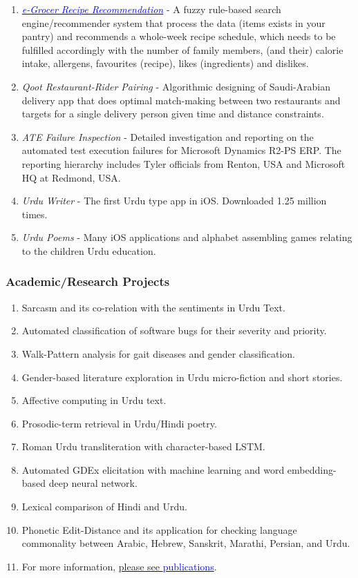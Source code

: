 \documentclass[a4paper, 10pt]{article}
\begin{document}
\begin{enumerate}
\item {\it \href{https://play.google.com/store/apps/details?id=com.egrocer&hl=en&gl=US}{\textcolor{blue}{e-Grocer Recipe Recommendation}}} - A fuzzy rule-based search engine/recommender system that process the data (items exists in your pantry) and recommends a whole-week recipe schedule, which needs to be fulfilled accordingly with the number of family members, (and their) calorie intake, allergens, favourites (recipe), likes (ingredients) and dislikes.

\item {\it Qoot Restaurant-Rider Pairing} - Algorithmic designing of Saudi-Arabian delivery app that does optimal match-making between two restaurants and targets for a single delivery person given time and distance constraints.

\item {\it ATE Failure Inspection} - Detailed investigation and reporting on the automated test execution failures for Microsoft Dynamics R2-PS ERP. The reporting hierarchy includes Tyler officials from Renton, USA and Microsoft HQ at Redmond, USA.

\item {\it Urdu Writer} - The first Urdu type app in iOS. Downloaded 1.25 million times.

\item {\it Urdu Poems} - Many iOS applications and alphabet assembling games relating to the children Urdu education.
\end{enumerate}
\subsubsection*{Academic/Research Projects}
\begin{enumerate}
\itemsep = 0em
\item Sarcasm and its co-relation with the sentiments in Urdu Text.
\item Automated classification of software bugs for their severity and priority.
\item Walk-Pattern analysis for gait diseases and gender classification.
\item Gender-based literature exploration in Urdu micro-fiction and short stories.
\item Affective computing in Urdu text.
\item Prosodic-term retrieval in Urdu/Hindi poetry.
\item Roman Urdu transliteration with character-based LSTM.
\item Automated GDEx elicitation with machine learning and word embedding-based deep neural network.
\item Lexical comparison of Hindi and Urdu.
\item Phonetic Edit-Distance and its application for checking language commonality between Arabic, Hebrew, Sanskrit, Marathi, Persian, and Urdu.
\item For more information, \hyperref[publications]{please see \textcolor{blue}{publications}}.
\end{enumerate}
\end{document}
